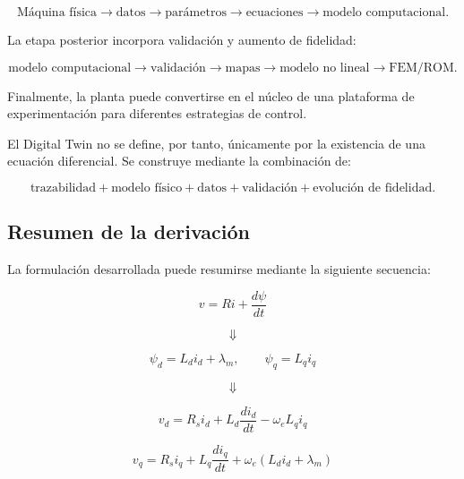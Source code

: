 \begin{equation}
\text{Máquina física}
\rightarrow
\text{datos}
\rightarrow
\text{parámetros}
\rightarrow
\text{ecuaciones}
\rightarrow
\text{modelo computacional}.
\end{equation}

La etapa posterior incorpora validación y aumento de fidelidad:

\begin{equation}
\text{modelo computacional}
\rightarrow
\text{validación}
\rightarrow
\text{mapas}
\rightarrow
\text{modelo no lineal}
\rightarrow
\text{FEM/ROM}.
\end{equation}

Finalmente, la planta puede convertirse en el núcleo de una plataforma de experimentación para diferentes estrategias de control.

El Digital Twin no se define, por tanto, únicamente por la existencia de una ecuación diferencial. Se construye mediante la combinación de:

\begin{equation}
\text{trazabilidad}
+
\text{modelo físico}
+
\text{datos}
+
\text{validación}
+
\text{evolución de fidelidad}.
\end{equation}

\subsection{Resumen de la derivación}

La formulación desarrollada puede resumirse mediante la siguiente secuencia:

\begin{equation}
v=Ri+\frac{d\psi}{dt}
\end{equation}

\begin{equation}
\Downarrow
\end{equation}

\begin{equation}
\psi_d=L_di_d+\lambda_m,
\qquad
\psi_q=L_qi_q
\end{equation}

\begin{equation}
\Downarrow
\end{equation}

\begin{equation}
v_d=
R_si_d+
L_d\frac{di_d}{dt}
-
\omega_eL_qi_q
\end{equation}

\begin{equation}
v_q=
R_si_q+
L_q\frac{di_q}{dt}
+
\omega_e(L_di_d+\lambda_m)
\end{equation}

